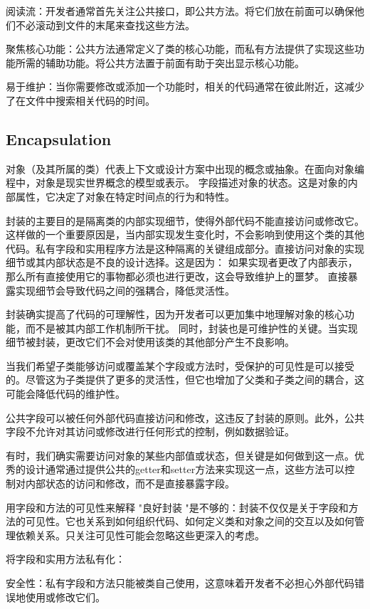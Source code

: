 阅读流：开发者通常首先关注公共接口，即公共方法。将它们放在前面可以确保他们不必滚动到文件的末尾来查找这些方法。

聚焦核心功能：公共方法通常定义了类的核心功能，而私有方法提供了实现这些功能所需的辅助功能。将公共方法置于前面有助于突出显示核心功能。

易于维护：当你需要修改或添加一个功能时，相关的代码通常在彼此附近，这减少了在文件中搜索相关代码的时间。

\subsection{Encapsulation}

对象（及其所属的类）代表上下文或设计方案中出现的概念或抽象。在面向对象编程中，对象是现实世界概念的模型或表示。
字段描述对象的状态。这是对象的内部属性，它决定了对象在特定时间点的行为和特性。

封装的主要目的是隔离类的内部实现细节，使得外部代码不能直接访问或修改它。这样做的一个重要原因是，当内部实现发生变化时，不会影响到使用这个类的其他代码。私有字段和实用程序方法是这种隔离的关键组成部分。直接访问对象的实现细节或其内部状态是不良的设计选择。这是因为：
如果实现者更改了内部表示，那么所有直接使用它的事物都必须也进行更改，这会导致维护上的噩梦。
直接暴露实现细节会导致代码之间的强耦合，降低灵活性。

封装确实提高了代码的可理解性，因为开发者可以更加集中地理解对象的核心功能，而不是被其内部工作机制所干扰。
同时，封装也是可维护性的关键。当实现细节被封装，更改它们不会对使用该类的其他部分产生不良影响。

当我们希望子类能够访问或覆盖某个字段或方法时，受保护的可见性是可以接受的。尽管这为子类提供了更多的灵活性，但它也增加了父类和子类之间的耦合，这可能会降低代码的维护性。

公共字段可以被任何外部代码直接访问和修改，这违反了封装的原则。此外，公共字段不允许对其访问或修改进行任何形式的控制，例如数据验证。

有时，我们确实需要访问对象的某些内部值或状态，但关键是如何做到这一点。优秀的设计通常通过提供公共的getter和setter方法来实现这一点，这些方法可以控制对内部状态的访问和修改，而不是直接暴露字段。

用字段和方法的可见性来解释 "良好封装 "是不够的：封装不仅仅是关于字段和方法的可见性。它也关系到如何组织代码、如何定义类和对象之间的交互以及如何管理依赖关系。只关注可见性可能会忽略这些更深入的考虑。

将字段和实用方法私有化：

安全性：私有字段和方法只能被类自己使用，这意味着开发者不必担心外部代码错误地使用或修改它们。

